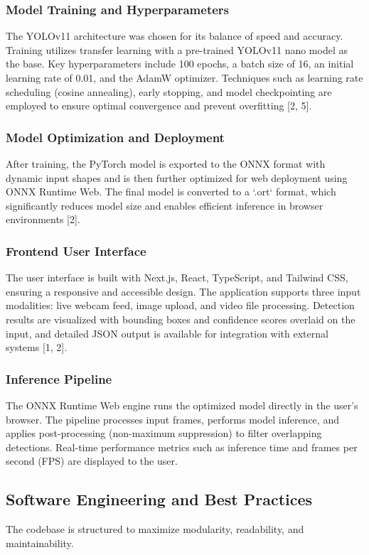 \subsubsection{Model Training and Hyperparameters}
The YOLOv11 architecture was chosen for its balance of speed and accuracy. Training utilizes transfer learning with a pre-trained YOLOv11 nano model as the base. Key hyperparameters include 100 epochs, a batch size of 16, an initial learning rate of 0.01, and the AdamW optimizer. Techniques such as learning rate scheduling (cosine annealing), early stopping, and model checkpointing are employed to ensure optimal convergence and prevent overfitting [2, 5].

\subsubsection{Model Optimization and Deployment}
After training, the PyTorch model is exported to the ONNX format with dynamic input shapes and is then further optimized for web deployment using ONNX Runtime Web. The final model is converted to a `.ort` format, which significantly reduces model size and enables efficient inference in browser environments [2].

\subsubsection{Frontend User Interface}
The user interface is built with Next.js, React, TypeScript, and Tailwind CSS, ensuring a responsive and accessible design. The application supports three input modalities: live webcam feed, image upload, and video file processing. Detection results are visualized with bounding boxes and confidence scores overlaid on the input, and detailed JSON output is available for integration with external systems [1, 2].

\subsubsection{Inference Pipeline}
The ONNX Runtime Web engine runs the optimized model directly in the user's browser. The pipeline processes input frames, performs model inference, and applies post-processing (non-maximum suppression) to filter overlapping detections. Real-time performance metrics such as inference time and frames per second (FPS) are displayed to the user.

\subsection{Software Engineering and Best Practices}
The codebase is structured to maximize modularity, readability, and maintainability.

